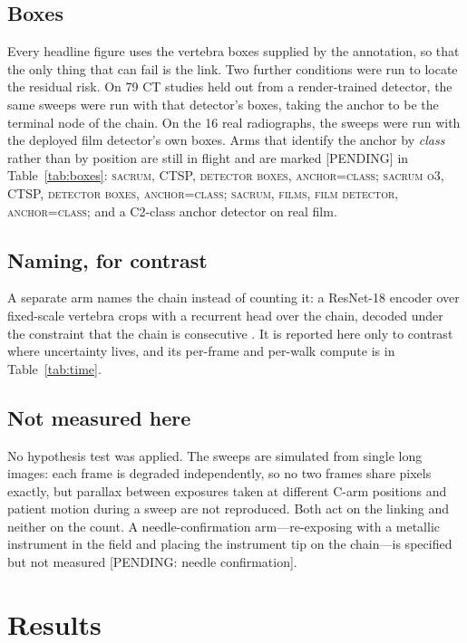 \documentclass[11pt,letterpaper]{article}
\begin{document}
\subsection*{Boxes}
Every headline figure uses the vertebra boxes supplied by the annotation, so that the only thing that can
fail is the link. Two further conditions were run to locate the residual risk. On 79 CT studies held out
from a render-trained detector, the same sweeps were run with that detector's boxes, taking the anchor to
be the terminal node of the chain. On the 16 real radiographs, the sweeps were run with the deployed film
detector's own boxes. Arms that identify the anchor by \emph{class} rather than by position are still in
flight and are marked [PENDING] in Table~\ref{tab:boxes}: \textsc{sacrum, CTSP, detector boxes,
anchor=class}; \textsc{sacrum o3, CTSP, detector boxes, anchor=class}; \textsc{sacrum, films, film
detector, anchor=class}; and a C2-class anchor detector on real film.

\subsection*{Naming, for contrast}
A separate arm names the chain instead of counting it: a ResNet-18 encoder over fixed-scale vertebra crops
with a recurrent head over the chain, decoded under the constraint that the chain is consecutive
\citep{he2016,schwing2026ctx,schwing2026mixed}. It is reported here only to contrast where uncertainty
lives, and its per-frame and per-walk compute is in Table~\ref{tab:time}.

\subsection*{Not measured here}
No hypothesis test was applied. The sweeps are simulated from single long images: each frame is degraded
independently, so no two frames share pixels exactly, but parallax between exposures taken at different
C-arm positions and patient motion during a sweep are not reproduced. Both act on the linking and neither
on the count. A needle-confirmation arm---re-exposing with a metallic instrument in the field and placing
the instrument tip on the chain---is specified but not measured [PENDING: needle confirmation].

\section*{Results}
\end{document}
